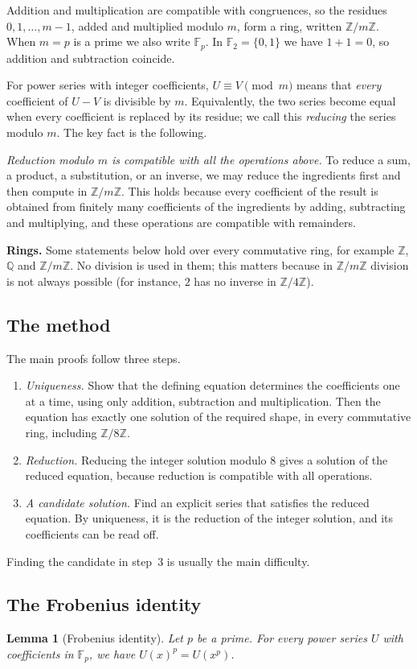 \documentclass[11pt,a4paper]{article}
\newtheorem{lemma}[theorem]{Lemma}
\theoremstyle{definition}
\theoremstyle{remark}
\newcommand{\Z}{\mathbb{Z}}
\newcommand{\Q}{\mathbb{Q}}
\newcommand{\F}{\mathbb{F}}
\newcommand{\para}[1]{\par\medskip\noindent\textbf{#1}\enspace}
\begin{document}
Addition and multiplication are compatible with congruences, so the residues $0,1,\dots,m-1$, added and multiplied
modulo $m$, form a ring, written $\Z/m\Z$. When $m=p$ is a prime we also write $\F_p$. In $\F_2=\{0,1\}$ we have $1+1=0$,
so addition and subtraction coincide.

For power series with integer coefficients, $U\equiv V\pmod m$ means that \emph{every} coefficient of $U-V$ is
divisible by $m$. Equivalently, the two series become equal when every coefficient is replaced by its residue; we call
this \emph{reducing} the series modulo $m$. The key fact is the following.

\emph{Reduction modulo $m$ is compatible with all the operations above.} To reduce a sum, a product, a substitution, or
an inverse, we may reduce the ingredients first and then compute in $\Z/m\Z$. This holds because every
coefficient of the result is obtained from finitely many coefficients of the ingredients by adding, subtracting and
multiplying, and these operations are compatible with remainders.

\para{Rings.} Some statements below hold over every commutative ring, for example $\Z$, $\Q$ and $\Z/m\Z$. No
division is used in them; this matters because in $\Z/m\Z$ division is not always possible (for instance, $2$ has no inverse in
$\Z/4\Z$).

\subsection{The method}
The main proofs follow three steps.
\begin{enumerate}
\item \emph{Uniqueness.} Show that the defining equation determines the coefficients one at a time, using only
addition, subtraction and multiplication. Then the equation has exactly one solution of the required shape, in every
commutative ring, including $\Z/8\Z$.
\item \emph{Reduction.} Reducing the integer solution modulo $8$ gives a solution of the reduced equation,
because reduction is compatible with all operations.
\item \emph{A candidate solution.} Find an explicit series that satisfies the reduced equation. By uniqueness, it is
the reduction of the integer solution, and its coefficients can be read off.
\end{enumerate}
Finding the candidate in step~3 is usually the main difficulty.
\subsection{The Frobenius identity}
\begin{lemma}[Frobenius identity]\label{lem:frobenius}
Let $p$ be a prime. For every power series $U$ with coefficients in $\F_p$, we have $U(x)^p=U(x^p)$.
\end{lemma}
\end{document}
